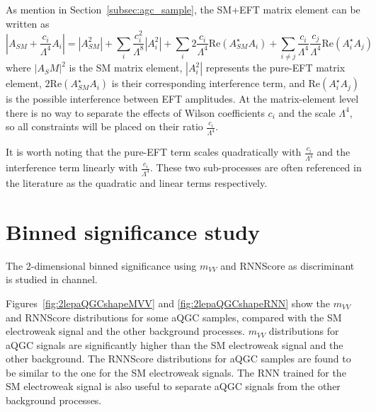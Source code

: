 As mention in Section~\ref{subsec:agc_sample}, the SM+EFT matrix element can be written as
\begin{equation}
   |A_{SM}+\frac{c_i}{\Lambda^4}A_i|=|A_{SM}^2|+\sum\limits_i \frac{c_i^2}{\Lambda^8}|A_{i}^2|+ \sum\limits_i 2 \frac{c_i}{\Lambda^4} \mathrm{Re}(A_{SM}^\star A_i) +\sum\limits_{i\neq j} \frac{c_i}{\Lambda^4} \frac{c_j}{\Lambda^4} \mathrm{Re}(A_i^\star A_j)
\end{equation}
where $|A_SM|^2$ is the SM matrix element, $|A_{i}^2|$ represents the pure-EFT matrix element, $2 \mathrm{Re}(A_{SM}^\star A_i)$ is their corresponding interference term, and $\mathrm{Re}(A_i^\star A_j)$ is the possible interference between EFT amplitudes. 
At the matrix-element level there is no way to separate the effects of Wilson coefficients $c_i$ and the scale $\Lambda^4$, so all constraints will be placed on their ratio $\frac{c_i}{\Lambda^4}$.

It is worth noting that the pure-EFT term scales quadratically with $\frac{c_i}{\Lambda^4}$ and the interference term linearly with $\frac{c_i}{\Lambda^4}$. These two sub-processes are often referenced in the literature as the quadratic and linear terms respectively.


\section{Binned significance study}

The 2-dimensional binned significance using $m_{VV}$ and RNNScore as discriminant is studied in \tlep channel.

Figures~\ref{fig:2lepaQGCshapeMVV} and \ref{fig:2lepaQGCshapeRNN} show the $m_{VV}$ and RNNScore distributions for some aQGC samples, compared with the SM electroweak signal and the other background processes.
$m_{VV}$ distributions for aQGC signals are significantly higher than the SM electroweak signal and the other background.
The RNNScore distributions for aQGC samples are found to be similar to the one for the SM electroweak signals.
The RNN trained for the SM electroweak signal is also useful to separate aQGC signals from the other background processes.

